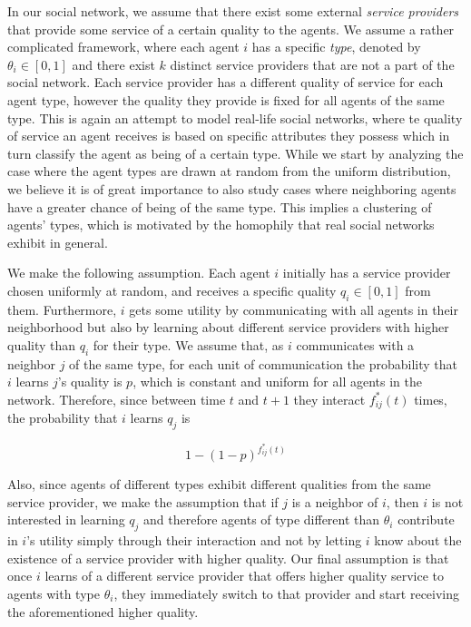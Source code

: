 \documentclass[format=acmsmall, review=false]{acmart}
\begin{document}
\par In our social network, we assume that there exist some external \textit{service providers} that provide some service of a
certain quality to the agents. We assume a rather complicated framework, where each agent $i$ has a specific \textit{type},
denoted by $\theta_i \in [0, 1]$ and there exist $k$ distinct service providers that are not a part of the social network. Each
service provider has a different quality of service for each agent type, however the quality they provide is fixed for all agents
of the same type. This is again an attempt to model real-life social networks, where te quality of service an agent receives
is based on specific attributes they possess which in turn classify the agent as being of a certain type. While we start by
analyzing the case where the agent types are drawn at random from the uniform distribution, we believe it is of great
importance to also study cases where neighboring agents have a greater chance of being of the same type. This implies a
clustering of agents' types, which is motivated by the homophily that real social networks exhibit in general.

\par We make the following assumption. Each agent $i$ initially has a service provider chosen uniformly at random, and receives a
specific quality $q_i \in [0, 1]$ from them. Furthermore, $i$ gets some utility by communicating with all agents in their
neighborhood but also by learning about different service providers with higher quality than $q_i$ for their type. We assume
that, as $i$ communicates with a neighbor $j$ of the same type, for each unit of communication the probability that $i$ learns
$j$'s quality is $p$, which is constant and uniform for all agents in the network. Therefore, since between time $t$ and $t+1$
they interact $f^*_{ij}(t)$ times, the probability that $i$ learns $q_j$ is

\[
1 - {\left( 1 - p \right)}^{f^*_{ij}(t)}
\]

\par Also, since agents of different types exhibit different qualities from the same service provider, we make the assumption
that if $j$ is a neighbor of $i$, then $i$ is not interested in learning $q_j$ and therefore agents of type different than
$\theta_i$ contribute in $i$'s utility simply through their interaction and not by letting $i$ know about the existence of a
service provider with higher quality. Our final assumption is that once $i$ learns of a different service provider that offers
higher quality service to agents with type $\theta_i$, they immediately switch to that provider and start receiving the
aforementioned higher quality.
\end{document}
